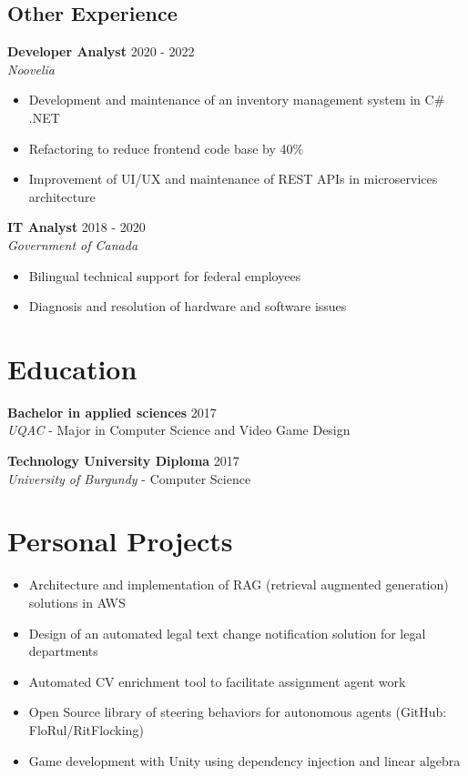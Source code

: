 ﻿\documentclass[11pt,letterpaper]{article}
\begin{document}
\subsection*{Other Experience}

\textbf{Developer Analyst} \hfill 2020 - 2022\\
\textit{Noovelia}
\begin{itemize}
\item Development and maintenance of an inventory management system in C\# .NET
\item Refactoring to reduce frontend code base by 40\%
\item Improvement of UI/UX and maintenance of REST APIs in microservices architecture
\end{itemize}

\textbf{IT Analyst} \hfill 2018 - 2020\\
\textit{Government of Canada}
\begin{itemize}
\item Bilingual technical support for federal employees
\item Diagnosis and resolution of hardware and software issues
\end{itemize}

\section*{Education}
\textbf{Bachelor in applied sciences} \hfill 2017\\
\textit{UQAC} - Major in Computer Science and Video Game Design

\textbf{Technology University Diploma} \hfill 2017\\
\textit{University of Burgundy} - Computer Science

\section*{Personal Projects}
\begin{itemize}
\item Architecture and implementation of RAG (retrieval augmented generation) solutions in AWS
\item Design of an automated legal text change notification solution for legal departments
\item Automated CV enrichment tool to facilitate assignment agent work
\item Open Source library of steering behaviors for autonomous agents (GitHub: FloRul/RitFlocking)
\item Game development with Unity using dependency injection and linear algebra
\end{itemize}
\end{document}
